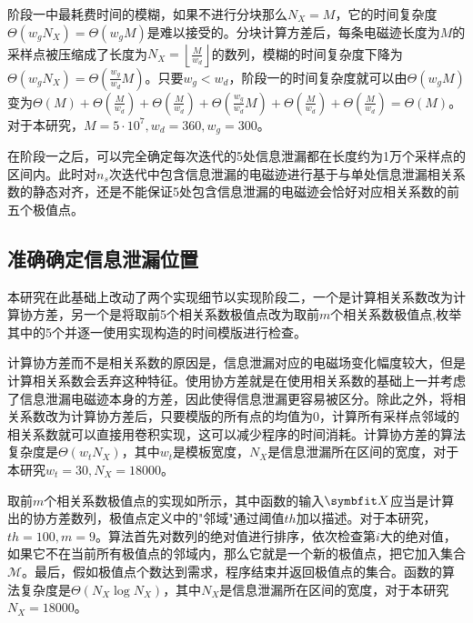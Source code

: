 {	阶段一中最耗费时间的模糊，如果不进行分块那么$N_X=M$，它的时间复杂度$\Theta(w_gN_X)=\Theta(w_gM)$是难以接受的。分块计算方差后，每条电磁迹长度为$M$的采样点被压缩成了长度为$N_X=\left\lfloor\frac{M}{w_d}\right\rfloor$的数列，模糊的时间复杂度下降为$\Theta(w_gN_X)=\Theta(\frac{w_g}{w_d}M)$。只要$w_g<w_d$，阶段一的时间复杂度就可以由$\Theta\left( w_gM\right) $变为$\Theta(M)+\Theta\left( \frac{M}{w_d}\right) +\Theta\left( \frac{M}{w_d}\right) +\Theta\left( \frac{w_g}{w_d}M\right) +\Theta\left( \frac{M}{w_d}\right) +\Theta\left( \frac{M}{w_d}\right) =\Theta(M)$。对于本研究，$M=5\cdot10^7,w_d=360,w_g=300$。
	
	在阶段一之后，可以完全确定每次迭代的5处信息泄漏都在长度约为1万个采样点的区间内。此时对$n_s$次迭代中包含信息泄漏的电磁迹进行基于与单处信息泄漏相关系数的静态对齐，还是不能保证5处包含信息泄漏的电磁迹会恰好对应相关系数的前五个极值点。
	
	\subsection{准确确定信息泄漏位置}\label{subs:phase2}
	本研究在此基础上改动了两个实现细节以实现阶段二，一个是计算相关系数改为计算协方差，另一个是将取前5个相关系数极值点改为取前$m$个相关系数极值点,枚举其中的5个并逐一使用实现构造的时间模版进行检查。
	
	
	
	计算协方差而不是相关系数的原因是，信息泄漏对应的电磁场变化幅度较大，但是计算相关系数会丢弃这种特征。使用协方差就是在使用相关系数的基础上一并考虑了信息泄漏电磁迹本身的方差，因此使得信息泄漏更容易被区分。除此之外，将相关系数改为计算协方差后，只要模版的所有点的均值为0，计算所有采样点邻域的相关系数就可以直接用卷积实现，这可以减少程序的时间消耗。计算协方差的算法复杂度是$\Theta(w_tN_X)$，其中$w_t$是模板宽度，$N_X$是信息泄漏所在区间的宽度，对于本研究$w_t=30,N_X=18000$。
	
	取前$m$个相关系数极值点的实现如所示，其中函数的输入$\Vector X$应当是计算出的协方差数列，极值点定义中的"邻域"通过阈值$th$加以描述。对于本研究，$th=100,m=9$。算法首先对数列的绝对值进行排序，依次检查第$i$大的绝对值，如果它不在当前所有极值点的邻域内，那么它就是一个新的极值点，把它加入集合$\mathcal M$。最后，假如极值点个数达到需求，程序结束并返回极值点的集合。函数的算法复杂度是$\Theta(N_X\log N_X)$，其中$N_X$是信息泄漏所在区间的宽度，对于本研究$N_X=18000$。
	
}
